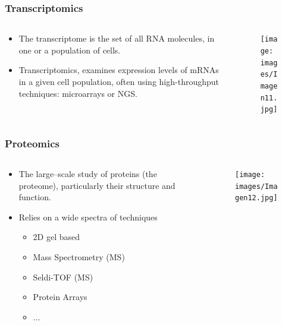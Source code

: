 \documentclass{beamer}
\begin{document}
 \begin{frame}
 	\frametitle{Transcriptomics}
 	\begin{columns}%
 		\begin{column}[t]{0.45\textwidth}%
 			\begin{itemize}
 				\item The transcriptome is the set of all RNA molecules, in one or a population of cells.
 				\item Transcriptomics, examines expression levels of mRNAs in a given cell population, often using high-throughput techniques: microarrays or NGS.
 			\end{itemize}
 		\end{column}
 		
 		\begin{column}[t]{0.45\textwidth}%
 			\begin{figure}[ht]
 				\centering
 				\texttt{[image: images/Imagen11.jpg]}
 			\end{figure} 
 		\end{column}
 	\end{columns}
 \end{frame}
 
 
 
 \begin{frame}
 	\frametitle{Proteomics}
 	\begin{columns}%
 		\begin{column}[t]{0.45\textwidth}%
 			\begin{itemize}
 				\item The large--scale study of proteins (the proteome), particularly their structure and function. 
 				\item Relies on a wide spectra of techniques 
 				\begin{itemize}
 					\item 2D gel based
 					\item Mass Spectrometry (MS)
 					\item Seldi-TOF (MS)
 					\item Protein Arrays
 					\item ...
 				\end{itemize}
 			\end{itemize}
 		\end{column}
 		
 		\begin{column}[t]{0.45\textwidth}%
 			\begin{figure}[ht]
 				\centering
 				\texttt{[image: images/Imagen12.jpg]}
 			\end{figure} 
 		\end{column}
 	\end{columns}
 \end{frame}
 
\end{document}

